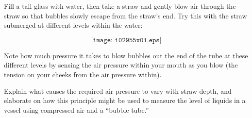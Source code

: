 

Fill a tall glass with water, then take a straw and gently blow air through the straw so that bubbles slowly escape from the straw's end.  Try this with the straw submerged at different levels within the water:

$$\texttt{[image: i02955x01.eps]}$$

Note how much pressure it takes to blow bubbles out the end of the tube at these different levels by sensing the air pressure within your mouth as you blow (the tension on your cheeks from the air pressure within).

\vskip 10pt

Explain what causes the required air pressure to vary with straw depth, and elaborate on how this principle might be used to measure the level of liquids in a vessel using compressed air and a ``bubble tube.''

















